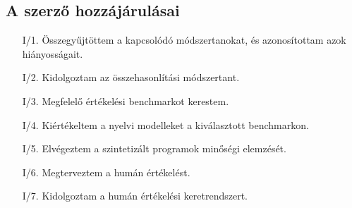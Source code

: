 \documentclass[12pt,a4paper]{extarticle}
\begin{document}
\subsection*{A szerző hozzájárulásai}

%


\begin{enumerate}[wide = 0pt, widest = {I/4.}, leftmargin =*]
	
	\item[I/1.] Összegyűjtöttem a kapcsolódó módszertanokat, és azonosítottam azok hiányosságait.
	
	\item[I/2.] Kidolgoztam az összehasonlítási módszertant.
	
	\item[I/3.] Megfelelő értékelési benchmarkot kerestem.
	
	\item[I/4.] Kiértékeltem a nyelvi modelleket a kiválasztott benchmarkon.
	
	\item[I/5.] Elvégeztem a szintetizált programok minőségi elemzését.
	
	\item[I/6.] Megterveztem a humán értékelést.
	
	\item[I/7.] Kidolgoztam a humán értékelési keretrendszert.
	
\end{enumerate}





\section{\thesispointtwohu}
\end{document}

